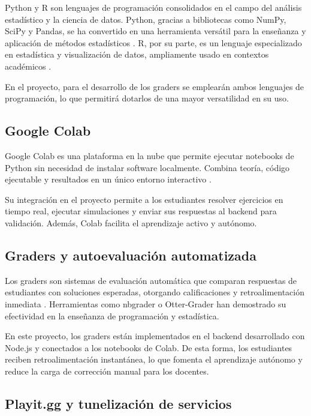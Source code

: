 \documentclass[letter,oneside,12pt,spanish]{report}
\begin{document}
Python y R son lenguajes de programación consolidados en el campo del análisis estadístico y la ciencia de datos. Python, gracias a bibliotecas como NumPy, SciPy y Pandas, se ha convertido en una herramienta versátil para la enseñanza y aplicación de métodos estadísticos \parencite{mckinney2017}. R, por su parte, es un lenguaje especializado en estadística y visualización de datos, ampliamente usado en contextos académicos \parencite{rcoreteam2023}.

En el proyecto, para el desarrollo de los graders se emplearán ambos lenguajes de programación, lo que permitirá dotarlos de una mayor versatilidad en su uso.

\subsection{Google Colab}

Google Colab es una plataforma en la nube que permite ejecutar notebooks de Python sin necesidad de instalar software localmente. Combina teoría, código ejecutable y resultados en un único entorno interactivo \parencite{bisong2019}.

Su integración en el proyecto permite a los estudiantes resolver ejercicios en tiempo real, ejecutar simulaciones y enviar sus respuestas al backend para validación. Además, Colab facilita el aprendizaje activo y autónomo.

\subsection{Graders y autoevaluación automatizada}

Los graders son sistemas de evaluación automática que comparan respuestas de estudiantes con soluciones esperadas, otorgando calificaciones y retroalimentación inmediata \parencite{kurnia2001}. Herramientas como nbgrader o Otter-Grader han demostrado su efectividad en la enseñanza de programación y estadística.

En este proyecto, los graders están implementados en el backend desarrollado con Node.js y conectados a los notebooks de Colab. De esta forma, los estudiantes reciben retroalimentación instantánea, lo que fomenta el aprendizaje autónomo y reduce la carga de corrección manual para los docentes.

\subsection{Playit.gg y tunelización de servicios}
\end{document}
